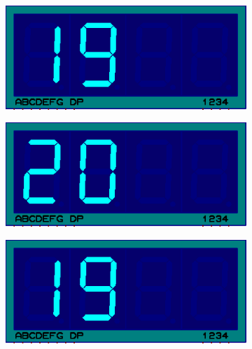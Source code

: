 \documentclass{lab_sheet}
\begin{document}
\begin{figure}[H]
        \begin{subfigure}{.33\textwidth}
          \centering
          \includegraphics[frame,width=.9\linewidth]{../Figures/d19}   
          \caption{}
          \label{fig:prob2-t}
        \end{subfigure}
        \begin{subfigure}{.33\textwidth}
          \centering
          \includegraphics[frame,width=.9\linewidth]{../Figures/d20}   
          \caption{}
          \label{fig:prob2-u}
        \end{subfigure}
        \newline
        \begin{subfigure}{.33\textwidth}
            \centering
            \includegraphics[frame,width=.9\linewidth]{../Figures/d19}   
            \caption{}
            \label{fig:prob2-v}
          \end{subfigure}
          \begin{subfigure}{.33\textwidth}
            \centering

\end{subfigure}
\end{figure}
\end{document}
